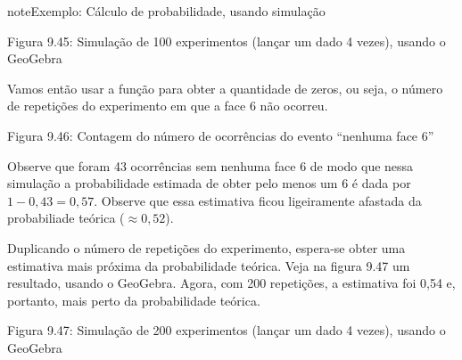\begin{sphinxadmonition}{note}{Exemplo: Cálculo de probabilidade, usando simulação}
\begin{figure}[H]
\noindent{}
\label{\detokenize{PE511-A:id9}}\end{figure}

Figura 9.45: Simulação de 100 experimentos (lançar um dado 4 vezes), usando o GeoGebra

Vamos então usar a função  para obter a quantidade de zeros, ou seja, o número de repetições do experimento em que a face 6 não ocorreu.
\label{\detokenize{PE511-A:id10}}
\begin{figure}[H]
\centering

\noindent{}
\label{\detokenize{PE511-A:id10}}\end{figure}

Figura 9.46: Contagem do número de ocorrências do evento “nenhuma face 6”

Observe que foram 43 ocorrências sem nenhuma face 6 de modo que nessa simulação a probabilidade estimada de obter pelo menos um 6 é dada por \(1-0,43=0,57\). Observe que essa estimativa ficou ligeiramente afastada da probabiliade teórica (\(\approx 0,52\)).

Duplicando o número de repetições do experimento, espera-se obter uma estimativa mais próxima da probabilidade teórica. Veja na figura 9.47 um resultado, usando o GeoGebra. Agora, com 200 repetições, a estimativa  foi 0,54 e, portanto, mais perto da probabilidade teórica.
\label{\detokenize{PE511-A:id11}}
\begin{figure}[H]
\centering

\noindent{}
\label{\detokenize{PE511-A:id11}}\end{figure}

Figura 9.47: Simulação de 200 experimentos (lançar um dado 4 vezes), usando o GeoGebra
\end{sphinxadmonition}


